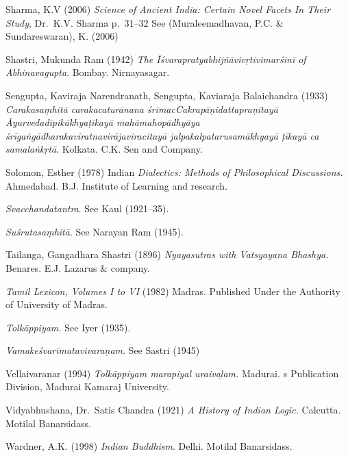 \begin{thebibliography}{99}
  Sharma, K.V (2006) \textit{Science of Ancient India: Certain Novel Facets In Their Study}, Dr.\ K.V. Sharma p.~31--32 See (Muraleemadhavan, P.C. \& Sundareswaran), K. (2006)

  Shastri, Mukunda Ram (1942) \textit{The Īśvarapratyabhijñāvivṛtivimarśinī of Abhinavagupta}. Bombay. Nirnayasagar.

  Sengupta, Kaviraja Narendranath, Sengupta, Kaviaraja Balaichandra (1933) \textit{Carakasaṃhitā carakacaturānana śrīmacCakrapāṇidattapraṇītayā Āyurvedadīpikākhyaṭīkayā mahāmahopādhyāya śrīgaṅgādharakaviratnavirājaviracitayā jalpakalpatarusamākhyayā ṭīkayā ca samalaṅkṛtā}. Kolkata. C.K. Sen and Company.

  Solomon, Esther (1978) Indian \textit{Dialectics: Methods of Philosophical Discussions.} Ahmedabad. B.J. Institute of Learning and research.

  \textit{Svacchandatantra}. See Kaul (1921--35).

  \textit{Suśrutasaṃhitā}. See Narayan Ram (1945).

  Tailanga, Gangadhara Shastri (1896) \textit{Nyayasutras with Vatsyayana Bhashya.} Benares. E.J. Lazarus \& company.

  \textit{Tamil Lexicon, Volumes I to VI} (1982) Madras. Published Under the Authority of University of Madras.

  \textit{Tolkāppiyam.} See Iyer (1935).

  \textit{Vamakeśvarīmatavivaraṇam}. See Sastri (1945)

  Vellaivaranar (1994) \textit{Tolkāppiyam marapiyal uraivaḻam.} Madurai\textit{.} s Publication Division, Madurai Kamaraj University.

  Vidyabhushana, Dr.\ Satis Chandra (1921) \textit{A History of Indian Logic.} Calcutta\textit{.} Motilal Banarsidass.

  Wardner, A.K. (1998) \textit{Indian Buddhism}. Delhi. Motilal Banarsidass.

 \end{thebibliography}

